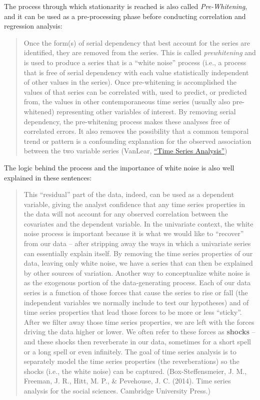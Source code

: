 \documentclass[
]{article}
\begin{document}
The process through which stationarity is reached is also called \emph{Pre-Whitening}, and it can be used as a pre-processing phase before conducting correlation and regression analysis:

\begin{quote}
Once the form(s) of serial dependency that best account for the series are identified, they are removed from the series. This is called \emph{prewhitening} and is used to produce a series that is a ``white noise'' process (i.e., a process that is free of serial dependency with each value statistically independent of other values in the series). Once pre-whitening is accomplished the values of that series can be correlated with, used to predict, or predicted from, the values in other contemporaneous time series (usually also pre-whitened) representing other variables of interest. By removing serial dependency, the pre-whitening process makes these analyses free of correlated errors. It also removes the possibility that a common temporal trend or pattern is a confounding explanation for the observed association between the two variable series (VanLear, \href{https://us.sagepub.com/en-us/nam/the-sage-encyclopedia-of-communication-research-methods/book244974}{``Time Series Analysis''})
\end{quote}

The logic behind the process and the importance of white noise is also well explained in these sentences:

\begin{quote}
This ``residual'' part of the data, indeed, can be used as a dependent variable, giving the analyst confidence that any time series properties in the data will not account for any observed correlation between the covariates and the dependent variable. In the univariate context, the white noise process is important because it is what we would like to ``recover'' from our data -- after stripping away the ways in which a univariate
series can essentially explain itself. By removing the time series properties of our data, leaving only white noise, we have a series that can then be explained by other sources of variation. Another way to conceptualize white noise is as the exogenous portion of the data-generating process. Each of our data series is a function of those forces that cause the series to rise or fall (the independent variables we normally include to test our hypotheses) and of time series properties that lead those forces to
be more or less ``sticky''. After we filter away those time series properties, we are left with the forces driving the data higher or lower. We often refer to these forces as \textbf{shocks} -- and these shocks then reverberate in our data, sometimes for a short spell or a long spell or even infinitely. The goal of time series analysis is to separately model the time series properties (the reverberations) so the shocks (i.e., the white noise) can be captured. (Box-Steffensmeier, J. M., Freeman, J. R., Hitt, M. P., \& Pevehouse, J. C. (2014). Time series analysis for the social sciences. Cambridge University Press.)
\end{quote}
\end{document}
